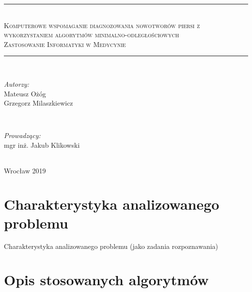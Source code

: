\documentclass[12pt]{article}
\begin{document}
\begin{titlepage}
\newcommand{\LINE}{\rule{\linewidth}{0.7mm}}
\center
\LINE \\[0.5cm]
\Large\textsc{Komputerowe wspomaganie diagnozowania nowotworów piersi z wykorzystaniem algorytmów minimalno-odległościowych}\\ [5mm]
\normalsize\textsc{Zastosowanie Informatyki w Medycynie}  \\[0.5cm]
\LINE \\[3cm]
\begin{minipage}{0.5\textwidth}
\begin{flushleft} \large
\emph{Autorzy:}
		\\Mateusz Ożóg %
		\\Grzegorz Milaszkiewicz %
\end{flushleft}
\end{minipage}
~
\begin{minipage}{0.45\textwidth}
\begin{flushright} \large
\emph{Prowadzący:} \\
mgr inż. Jakub Klikowski
\end{flushright}
\end{minipage}\\[2cm]
\vfill
\center Wrocław 2019
\end{titlepage}

\renewcommand{\contentsname}{Spis treści}
\tableofcontents
\newpage

\section{Charakterystyka analizowanego problemu}
Charakterystyka analizowanego problemu (jako zadania rozpoznawania)

\section{Opis stosowanych algorytmów}
\end{document}
